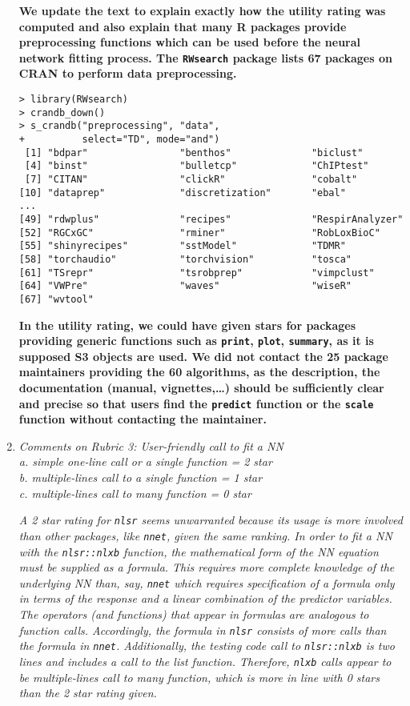 \documentclass[12pt]{article}
\newcommand{\code}{\texttt}
\newcommand{\soft}{\textsf}
\begin{document}
\begin{enumerate}
\textbf{We update the text to explain exactly how the utility rating was computed and also explain
that many \soft{R} packages provide preprocessing functions which can be used before the neural network
fitting process.
The \code{RWsearch} package lists 67 packages on CRAN to perform data preprocessing.}
\begin{verbatim}
> library(RWsearch)
> crandb_down()
> s_crandb("preprocessing", "data",
+          select="TD", mode="and")
 [1] "bdpar"                "benthos"              "biclust"             
 [4] "binst"                "bulletcp"             "ChIPtest"            
 [7] "CITAN"                "clickR"               "cobalt"              
[10] "dataprep"             "discretization"       "ebal"                
...    
[49] "rdwplus"              "recipes"              "RespirAnalyzer"      
[52] "RGCxGC"               "rminer"               "RobLoxBioC"          
[55] "shinyrecipes"         "sstModel"             "TDMR"                
[58] "torchaudio"           "torchvision"          "tosca"               
[61] "TSrepr"               "tsrobprep"            "vimpclust"           
[64] "VWPre"                "waves"                "wiseR"               
[67] "wvtool"  
\end{verbatim}
\textbf{In the utility rating, we could have given stars for packages providing generic functions such as \code{print},
\code{plot}, \code{summary}, as it is supposed S3 objects are used. 
We did not contact the 25 package maintainers providing the 60 algorithms, as the description, the documentation 
(manual, vignettes,\dots) should be sufficiently clear and precise so that users find the \code{predict} function
or the \code{scale} function without contacting the maintainer.
}

\item \textit{
Comments on Rubric 3: User-friendly call to fit a NN\\
       a. simple one-line call or a single function = 2 star\\
       b. multiple-lines call to a single function = 1 star\\
       c. multiple-lines call to many function = 0 star}

       
 \textit{A 2 star rating for \code{nlsr} seems unwarranted because its usage is more involved than other packages, like \code{nnet}, given the same ranking.  In order to fit a NN with the \code{nlsr::nlxb} function, the mathematical form of the NN equation must be supplied as a formula.  This requires more complete knowledge of the underlying NN than, say, \code{nnet} which requires specification of a formula only in terms of the response and a linear combination of the predictor variables.  The operators (and functions) that appear in formulas are analogous to function calls.  Accordingly, the formula in \code{nlsr} consists of more calls than the formula in \code{nnet}.  Additionally, the testing code call to \code{nlsr::nlxb} is two lines and includes a call to the list function.  Therefore, \code{nlxb} calls appear to be multiple-lines call to many function, which is more in line with 0 stars than the 2 star rating given.}


\end{enumerate}
\end{document}
